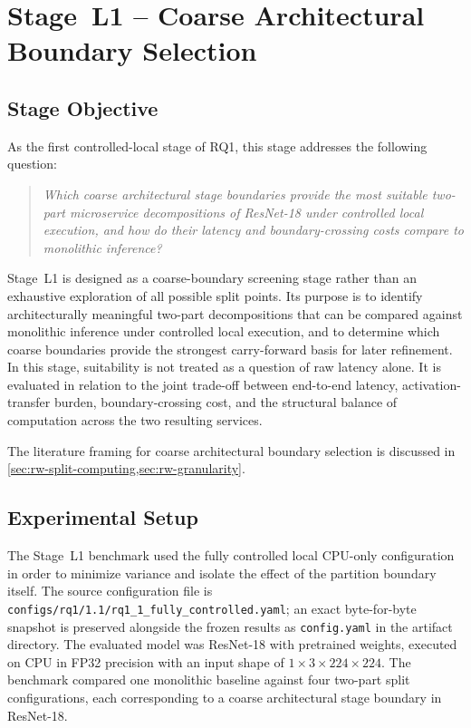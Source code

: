 \section{Stage~L1 -- Coarse Architectural Boundary Selection}
\label{sec:rq11}

\subsection{Stage Objective}
As the first controlled-local stage of RQ1, this stage addresses the following question:

\begin{quote}
\textit{Which coarse architectural stage boundaries provide the most suitable two-part microservice decompositions of ResNet-18 under controlled local execution, and how do their latency and boundary-crossing costs compare to monolithic inference?}
\end{quote}

Stage~L1 is designed as a coarse-boundary screening stage rather than an exhaustive exploration of all possible split points. Its purpose is to identify architecturally meaningful two-part decompositions that can be compared against monolithic inference under controlled local execution, and to determine which coarse boundaries provide the strongest carry-forward basis for later refinement. In this stage, suitability is not treated as a question of raw latency alone. It is evaluated in relation to the joint trade-off between end-to-end latency, activation-transfer burden, boundary-crossing cost, and the structural balance of computation across the two resulting services.

The literature framing for coarse architectural boundary selection is discussed
in \cref{sec:rw-split-computing,sec:rw-granularity}.

\subsection{Experimental Setup}
The Stage~L1 benchmark used the fully controlled local CPU-only configuration in order to minimize variance and isolate the effect of the partition boundary itself. The source configuration file is \texttt{configs/rq1/1.1/rq1\_1\_fully\_controlled.yaml}; an exact byte-for-byte snapshot is preserved alongside the frozen results as \texttt{config.yaml} in the artifact directory. The evaluated model was ResNet-18 with pretrained weights, executed on CPU in FP32 precision with an input shape of $1 \times 3 \times 224 \times 224$. The benchmark compared one monolithic baseline against four two-part split configurations, each corresponding to a coarse architectural stage boundary in ResNet-18.

